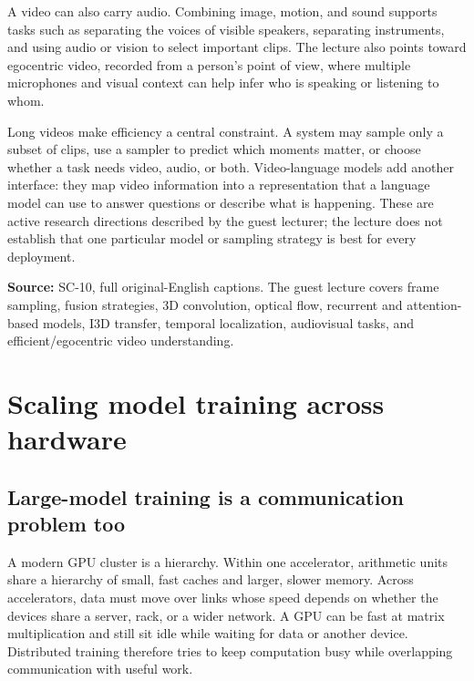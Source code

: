 \hypertarget{04-visual-computing-ii-ch031-video-understanding-includes-more-than-action-labels}{}

A video can also carry audio. Combining image, motion, and sound supports tasks such as separating the voices of visible speakers, separating instruments, and using audio or vision to select important clips. The lecture also points toward egocentric video, recorded from a person's point of view, where multiple microphones and visual context can help infer who is speaking or listening to whom.

Long videos make efficiency a central constraint. A system may sample only a subset of clips, use a sampler to predict which moments matter, or choose whether a task needs video, audio, or both. Video-language models add another interface: they map video information into a representation that a language model can use to answer questions or describe what is happening. These are active research directions described by the guest lecturer; the lecture does not establish that one particular model or sampling strategy is best for every deployment.

\textbf{Source:} SC-10, full original-English captions. The guest lecture covers frame sampling, fusion strategies, 3D convolution, optical flow, recurrent and attention-based models, I3D transfer, temporal localization, audiovisual tasks, and efficient/egocentric video understanding.

\section{Scaling model training across hardware}\label{04-visual-computing-ii-ch031-scaling-model-training-across-hardware}

\hypertarget{04-visual-computing-ii-ch031-scaling-model-training-across-hardware}{}

\subsection{Large-model training is a communication problem too}\label{04-visual-computing-ii-ch031-large-model-training-is-a-communication-problem-too}

\hypertarget{04-visual-computing-ii-ch031-large-model-training-is-a-communication-problem-too}{}

A modern GPU cluster is a hierarchy. Within one accelerator, arithmetic units share a hierarchy of small, fast caches and larger, slower memory. Across accelerators, data must move over links whose speed depends on whether the devices share a server, rack, or a wider network. A GPU can be fast at matrix multiplication and still sit idle while waiting for data or another device. Distributed training therefore tries to keep computation busy while overlapping communication with useful work.

